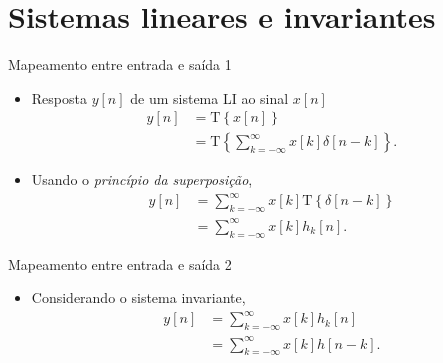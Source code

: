 \documentclass[
size=17pt,
paper=smartboard,
mode=present,
display=slidesnotes,
style=sailor,
nopagebreaks,
blackslide,
fleqn]{powerdot}
\begin{document}
\section[slide=false]{Sistemas lineares e invariantes} 
\begin{slide}{Mapeamento entre entrada e saída 1}
   \begin{itemize}
    \item <1->Resposta $y[n]$ de um sistema LI ao sinal $x[n]$
    \begin{align*}
        y[n]&=\text{T}\left \{ x[n] \right \}\\
            &=\text{T}\left \{ \sum_{k=-\infty}^{\infty}x[k]\delta [n-k] \right \}.
    \end{align*}
     \item <2-> Usando o \emph{princípio da superposição},
     \begin{align*}
        y[n]&=\sum_{k=-\infty}^{\infty}x[k]\text{T}\left \{ \delta [n-k] \right \}\\
            &=\sum_{k=-\infty}^{\infty}x[k]h_k[n].
     \end{align*}
   \end{itemize}
\end{slide}


\begin{slide}{Mapeamento entre entrada e saída 2}
   \begin{itemize}
    \item <1->Considerando o sistema invariante,
    \begin{align*}
        y[n]&=\sum_{k=-\infty}^{\infty}x[k]h_k[n]\\
            &=\sum_{k=-\infty}^{\infty}x[k]h[n-k].
     \end{align*}
   \end{itemize}
\end{slide}
\end{document}
